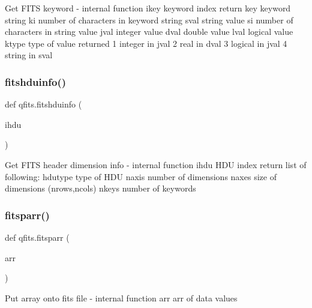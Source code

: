 \begin{DoxyVerb}Get FITS keyword - internal function
    ikey    keyword index
return  
    key    keyword string
    ki     number of characters in keyword string
    sval   string value
    si     number of characters in string value
    jval   integer value
    dval   double value
    lval   logical value
    ktype  type of value returned
             1 integer in jval
             2 real in dval
             3 logical in jval 
             4 string in sval
\end{DoxyVerb}
 \mbox{\label{namespaceqfits_ab1144d003dd9234f36d0cdd92ac004d2}} 
\subsubsection{\texorpdfstring{fitshduinfo()}{fitshduinfo()}}
{\footnotesize\ttfamily def qfits.\+fitshduinfo (\begin{DoxyParamCaption}\item[{}]{ihdu }\end{DoxyParamCaption})}

\begin{DoxyVerb}Get FITS header dimension info - internal function
    ihdu    HDU index
return    list of following:
    hdutype    type of HDU
    naxis      number of dimensions
    naxes      size of dimensions (nrows,ncols)
    nkeys      number of keywords
\end{DoxyVerb}
 \mbox{\label{namespaceqfits_a1bd7a6e17d916ce23ed143bf0d23f028}} 
\subsubsection{\texorpdfstring{fitsparr()}{fitsparr()}}
{\footnotesize\ttfamily def qfits.\+fitsparr (\begin{DoxyParamCaption}\item[{}]{arr }\end{DoxyParamCaption})}

\begin{DoxyVerb}Put array onto fits file - internal function
    arr     arr of data values
\end{DoxyVerb}
 \mbox{\label{namespaceqfits_a06a6a0e4363443cea2896d24954b91b1}} 

